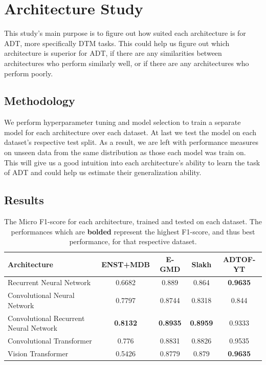 \chapter{Architecture Study}\label{Study1}

This study's main purpose is to figure out how suited each architecture is for \acrfull{ADT}, more specifically \acrfull{DTM} tasks. This could help us figure out which architecture is superior for \gls{ADT}, if there are any similarities between architectures who perform similarly well, or if there are any architectures who perform poorly.

\section{Methodology}

We perform hyperparameter tuning and model selection to train a separate model for each architecture over each dataset. At last we test the model on each dataset's respective test split. As a result, we are left with performance measures on unseen data from the same distribution as those each model was train on. This will give us a good intuition into each architecture's ability to learn the task of \gls{ADT} and could help us estimate their generalization ability.

\section{Results}	

\begin{table}[H]
    \centering
    \hspace*{-0.6cm}
    \begin{tabular}{l|cccc}
        Architecture & ENST+MDB & E-GMD & Slakh & ADTOF-YT       \\
        \hline
        Recurrent Neural Network	& 0.6682 &	0.889 &	0.864 &	\textbf{0.9635} \\
        Convolutional Neural Network	& 0.7797 &	0.8744 &	0.8318 &	0.844 \\
        Convolutional Recurrent Neural Network	& \textbf{0.8132} &	\textbf{0.8935} &	\textbf{0.8959} &	0.9333 \\
        Convolutional Transformer	& 0.776 &	0.8831 &	0.8826 &	0.9535 \\
        Vision Transformer	& 0.5426 &	0.8779 &	0.879 &	\textbf{0.9635} \\
        
    \end{tabular}
    \caption{The Micro F1-score for each architecture, trained and tested on each dataset. The performances which are \textbf{bolded} represent the highest F1-score, and thus best performance, for that respective dataset.}
    \label{ArchitectureResultsTable}
\end{table}


